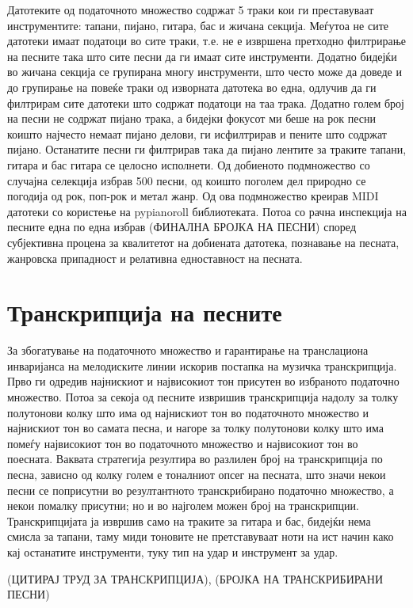 Датотеките од податочното множество содржат 5 траки кои ги преставуваат инструментите: тапани, пијано, гитара, бас и жичана секција. Меѓутоа не сите датотеки имаат податоци во сите траки, т.е. не е извршена претходно филтрирање на песните така што сите песни да ги имаат сите инструменти. Додатно бидејќи во жичана секција се групирана многу инструменти, што често може да доведе и до групирање на повеќе траки од изворната датотека во една, одлучив да ги филтрирам сите датотеки што содржат податоци на таа трака. Додатно голем број на песни не содржат пијано трака, а бидејки фокусот ми беше на рок песни коишто најчесто немаат пијано делови, ги исфилтрирав и пените што содржат пијано. Останатите песни ги филтрирав така да пијано лентите за траките тапани, гитара и бас гитара се целосно исполнети. Од добиеното подмножество со случајна селекција избрав 500 песни, од коишто поголем дел природно се погодија од рок, поп-рок и метал жанр. Од ова подмножество креирав MIDI датотеки со користење на pypianoroll библиотеката. Потоа со рачна инспекција на песните една по една избрав (ФИНАЛНА БРОЈКА НА ПЕСНИ) според субјективна процена за квалитетот на добиената датотека, познавање на песната, жанровска припадност и релативна едноставност на песната.

\section{Транскрипција на песните}

За збогатување на податочното множество и гарантирање на транслациона инваријанса на мелодиските линии искорив постапка на музичка транскрипција. Прво ги одредив најнискиот и највисокиот тон присутен во избраното податочно множество. Потоа за секоја од песните извришив транскрипција надолу за толку полутонови колку што има од најнискиот тон во податочното множество и најнискиот тон во самата песна, и нагоре за толку полутонови колку што има помеѓу највисокиот тон во податочното множество и највисокиот тон во поесната. Ваквата стратегија резултира во разлилен број на транскрипција по песна, зависно од колку голем е тоналниот опсег на песната, што значи некои песни се поприсутни во резултантното транскрибирано податочно множество, а некои помалку присутни; но и во најголем можен број на транскрипции. Транскрипцијата ја извршив само на траките за гитара и бас, бидејќи нема смисла за тапани, таму миди тоновите не претставуваат ноти на ист начин како кај останатите инструменти, туку тип на удар и инструмент за удар.

(ЦИТИРАЈ ТРУД ЗА ТРАНСКРИПЦИЈА), (БРОЈКА НА ТРАНСКРИБИРАНИ ПЕСНИ)

